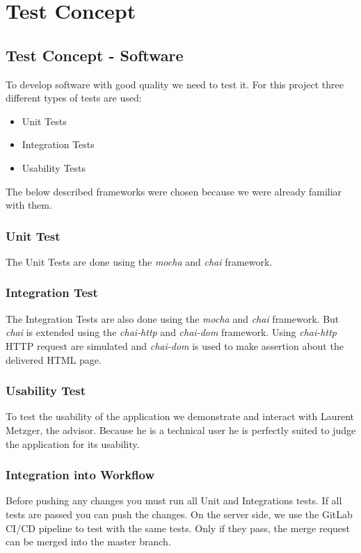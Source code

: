\chapter{Test Concept}

\section{Test Concept - Software}
To develop software with good quality we need to test it.
For this project three different types of tests are used:

\begin{itemize}
  \item Unit Tests
  \item Integration Tests
  \item Usability Tests
\end{itemize}

The below described frameworks were chosen because we were already familiar with them.

\subsection{Unit Test}
The Unit Tests are done using the \textit{mocha} and \textit{chai} framework.

\subsection{Integration Test}
The Integration Tests are also done using the \textit{mocha} and \textit{chai} framework.
But \textit{chai} is extended using the \textit{chai-http} and \textit{chai-dom} framework.
Using \textit{chai-http} HTTP request are simulated and \textit{chai-dom} is used to make assertion about the delivered HTML page.

\subsection{Usability Test}
To test the usability of the application we demonstrate and interact with Laurent Metzger, the advisor.
Because he is a technical user he is perfectly suited to judge the application for its usability.

\subsection{Integration into Workflow}
Before pushing any changes you must run all Unit and Integrations tests.
If all tests are passed you can push the changes.
On the server side, we use the GitLab CI/CD pipeline to test with the same tests.
Only if they pass, the merge request can be merged into the master branch.

